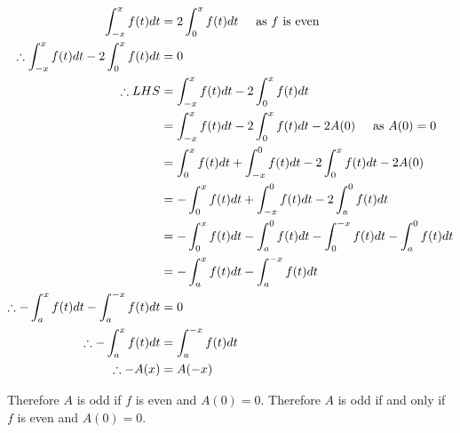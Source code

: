 \documentclass[a4paper]{article}
\begin{document}
\begin{enumerate}[label=\textbf{\arabic*.}]
\begin{enumerate}
\begin{enumerate}
		\begin{align*}
		\int_{-x}^{x}f(t)dt & = 2\int_{0}^{x}f(t)dt \hspace{5mm} \text{as $\displaystyle{f}$ is even}\\
		\therefore \int_{-x}^{x}f(t)dt - 2\int_{0}^{x}f(t)dt & = 0\\
		\therefore LHS & = \int_{-x}^{x}f(t)dt - 2\int_{0}^{x}f(t)dt\\
		& = \int_{-x}^{x}f(t)dt - 2\int_{0}^{x}f(t)dt - 2A(0) \hspace{5mm} \text{as $\displaystyle{A(0)=0}$}\\
		& = \int_{0}^{x}f(t)dt + \int_{-x}^{0}f(t)dt  - 2\int_{0}^{x}f(t)dt - 2A(0)\\
		& = -\int_{0}^{x}f(t)dt + \int_{-x}^{0}f(t)dt - 2\int_{a}^{0}f(t)dt\\
		& = -\int_{0}^{x}f(t)dt - \int_{a}^{0}f(t)dt - \int_{0}^{-x}f(t)dt - \int_{a}^{0}f(t)dt\\
		& = -\int_{a}^{x}f(t)dt - \int_{a}^{-x}f(t)dt\\
		\therefore -\int_{a}^{x}f(t)dt - \int_{a}^{-x}f(t)dt & = 0\\
		\therefore -\int_{a}^{x}f(t)dt & = \int_{a}^{-x}f(t)dt\\
		\therefore - A(x) & = A(-x)\\
		\end{align*}

		Therefore $\displaystyle{A}$ is odd if $\displaystyle{f}$ is even and $\displaystyle{A(0)=0}$. Therefore $\displaystyle{A}$ is odd if and only if $\displaystyle{f}$ is even and $\displaystyle{A(0)=0}$.

		\end{enumerate}

	\end{enumerate}

\end{enumerate}
\end{document}
